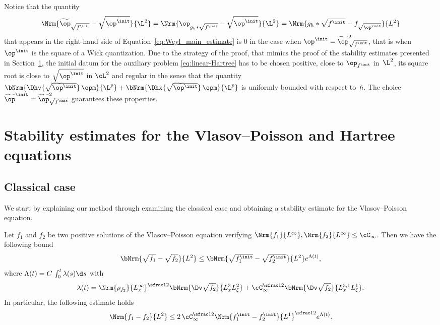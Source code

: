 \begin{remark}\label{rem:initial_data}
Notice that the quantity
\begin{equation*}
\Nrm{\widetilde{\op}_{\sqrt{f^\init}} - \sqrt{\op^\init}}{\L^2}= \Nrm{\op_{g_h*\sqrt{f^\init}} - \sqrt{\op^\init}}{\L^2} = \Nrm{g_h*\sqrt{f^\init} - f_{\sqrt{\op^\init}}}{L^2}
\end{equation*}
that appears in the right-hand side of Equation~\eqref{eq:Weyl_main_estimate} is $0$ in the case when $\op^\init = \widetilde{\op}_{\sqrt{f^\init}}^2$, that is when $\op^\init$ is the square of a Wick quantization. Due to the strategy of the proof, that mimics the proof of the stability estimates presented in Section~\ref{sec:stability-est}, the initial datum for the auxiliary problem \eqref{eq:linear-Hartree} has to be chosen positive, close to $\op_{f^\init}$ in~$\L^2$, its square root is close to $\sqrt{\op^\init}$ in $\cL^2$ and regular in the sense that the quantity
$\bNrm{\Dhv{\sqrt{\smash[t]{\widetilde{\op}}^{\init}}}\,\opm}{\L^p} + \bNrm{\Dhx{\sqrt{\smash[t]{\widetilde{\op}}^{\init}}}\,\opm}{\L^p}$ is uniformly bounded with respect to~$\hbar$. The choice $\widetilde{\op}^\init = \widetilde{\op}_{\sqrt{f^\init}}^2$ guarantees these properties.
\end{remark}

\section{Stability estimates for the Vlasov--Poisson and Hartree equations}\label{sec:stability-est}

\subsection{Classical case}

We start by explaining our method through examining the classical case and obtaining a stability estimate for the Vlasov--Poisson equation.

\begin{theorem}
Let $f_1$ and $f_2$ be two positive solutions of the Vlasov--Poisson equation verifying $\Nrm{f_1}{L^\infty}, \Nrm{f_2}{L^\infty} \leq \cC_{\infty}$. Then we have the following bound
\begin{equation*}
\bNrm{\sqrt{f_1} - \sqrt{f_2}}{L^2} \leq \bNrm{\sqrt{f_1^{\smash{\init}}} - \sqrt{f_2^{\smash{\init}}}}{L^2} e^{\Lambda(t)},
\end{equation*}
where $\Lambda(t) = C\,\int_0^t \lambda(s)\d s$ with
\begin{equation*}
\lambda(t) = \Nrm{{\rho_{f_2}}}{L^{\infty}_x}^{\sfrac12} \bNrm{\Dv \sqrt{f_2}}{L^3_xL^2_\xi} + \cC_{\infty}^{\sfrac12} \bNrm{\Dv \sqrt{f_2}}{L^{3,1}_xL^1_\xi}.
\end{equation*}
In particular, the following estimate holds
\begin{equation*}
\Nrm{f_1-f_2}{L^2} \leq 2\, \cC_{\infty}^{\sfrac12} \Nrm{f_1^\init-f_2^\init}{L^1}^{\sfrac12} e^{\Lambda(t)}.
\end{equation*}
\end{theorem}

